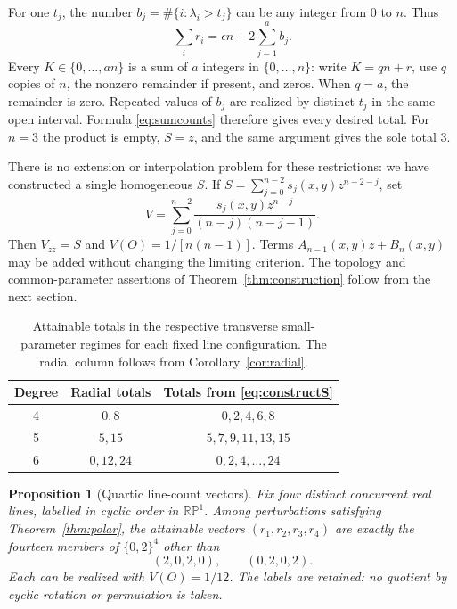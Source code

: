 \documentclass[11pt,a4paper]{article}
\newtheorem{proposition}[theorem]{Proposition}
\theoremstyle{remark}
\newcommand{\RP}{\mathbb {RP}}
\begin{document}
For one \(t_j\), the number \(b_j=\#\{i:\lambda_i>t_j\}\) can be
any integer from \(0\) to \(n\). Thus
\begin{equation}\label{eq:sumcounts}
                    \sum_i r_i=\epsilon n+2\sum_{j=1}^{a}b_j.
\end{equation}
Every \(K\in\{0,\ldots,an\}\) is a sum of \(a\) integers in
\(\{0,\ldots,n\}\): write \(K=qn+r\), use \(q\) copies of \(n\),
the nonzero remainder if present, and zeros. When \(q=a\), the
remainder is zero. Repeated values of \(b_j\) are realized by
distinct \(t_j\) in the same open interval. Formula
\eqref{eq:sumcounts} therefore gives every desired total.
For \(n=3\) the product is empty, \(S=z\), and the same argument
gives the sole total \(3\).

There is no extension or interpolation problem for these restrictions:
we have constructed a single homogeneous \(S\). If
\(S=\sum_{j=0}^{n-2}s_j(x,y)z^{n-2-j}\), set
\begin{equation}\label{eq:integrate}
 V=\sum_{j=0}^{n-2}
       \frac{s_j(x,y)z^{n-j}}{(n-j)(n-j-1)}.
\end{equation}
Then \(V_{zz}=S\) and \(V(O)=1/[n(n-1)]\).
Terms \(A_{n-1}(x,y)z+B_n(x,y)\) may be added without changing
the limiting criterion. The topology and common-parameter assertions
of Theorem~\ref{thm:construction} follow from the next section.

\begin{table}[ht]
\centering
\begin{tabular}{ccc}
\toprule
Degree & Radial totals & Totals from \eqref{eq:constructS}\\
\midrule
4 & \(0,8\) & \(0,2,4,6,8\)\\
5 & \(5,15\) & \(5,7,9,11,13,15\)\\
6 & \(0,12,24\) & \(0,2,4,\ldots,24\)\\
\bottomrule
\end{tabular}
\caption{Attainable totals in the respective transverse
small-parameter regimes for each fixed line configuration.
The radial column follows from Corollary~\ref{cor:radial}.}
\label{tab:counts}
\end{table}

\begin{proposition}[Quartic line-count vectors]\label{prop:quarticvectors}
Fix four distinct concurrent real lines, labelled in cyclic order
in \(\RP^1\). Among perturbations satisfying
Theorem~\ref{thm:polar}, the attainable vectors
\((r_1,r_2,r_3,r_4)\) are exactly the fourteen members of
\(\{0,2\}^4\) other than
\[
                         (2,0,2,0),\qquad(0,2,0,2).
\]
Each can be realized with \(V(O)=1/12\). The labels are retained:
no quotient by cyclic rotation or permutation is taken.
\end{proposition}
\end{document}
